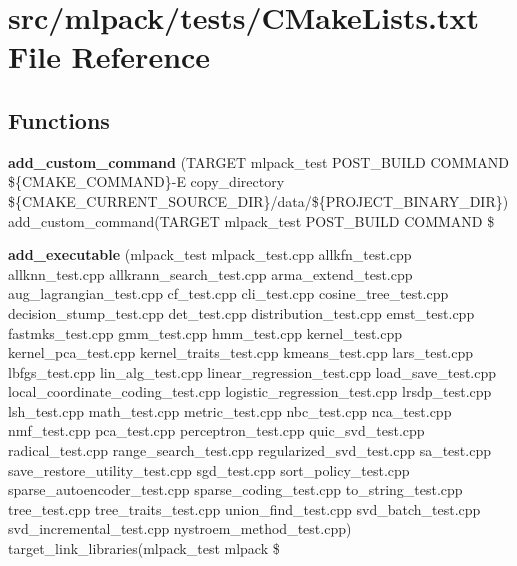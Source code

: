 \section{src/mlpack/tests/\-C\-Make\-Lists.txt File Reference}
\label{tests_2CMakeLists_8txt}
\subsection*{Functions}
\begin{DoxyCompactItemize}
\item 
{\bf add\-\_\-custom\-\_\-command} (T\-A\-R\-G\-E\-T mlpack\-\_\-test P\-O\-S\-T\-\_\-\-B\-U\-I\-L\-D C\-O\-M\-M\-A\-N\-D \$\{C\-M\-A\-K\-E\-\_\-\-C\-O\-M\-M\-A\-N\-D\}-\/E copy\-\_\-directory \$\{C\-M\-A\-K\-E\-\_\-\-C\-U\-R\-R\-E\-N\-T\-\_\-\-S\-O\-U\-R\-C\-E\-\_\-\-D\-I\-R\}/data/\$\{P\-R\-O\-J\-E\-C\-T\-\_\-\-B\-I\-N\-A\-R\-Y\-\_\-\-D\-I\-R\}) add\-\_\-custom\-\_\-command(T\-A\-R\-G\-E\-T mlpack\-\_\-test P\-O\-S\-T\-\_\-\-B\-U\-I\-L\-D C\-O\-M\-M\-A\-N\-D \$
\item 
{\bf add\-\_\-executable} (mlpack\-\_\-test mlpack\-\_\-test.\-cpp allkfn\-\_\-test.\-cpp allknn\-\_\-test.\-cpp allkrann\-\_\-search\-\_\-test.\-cpp arma\-\_\-extend\-\_\-test.\-cpp aug\-\_\-lagrangian\-\_\-test.\-cpp cf\-\_\-test.\-cpp cli\-\_\-test.\-cpp cosine\-\_\-tree\-\_\-test.\-cpp decision\-\_\-stump\-\_\-test.\-cpp det\-\_\-test.\-cpp distribution\-\_\-test.\-cpp emst\-\_\-test.\-cpp fastmks\-\_\-test.\-cpp gmm\-\_\-test.\-cpp hmm\-\_\-test.\-cpp kernel\-\_\-test.\-cpp kernel\-\_\-pca\-\_\-test.\-cpp kernel\-\_\-traits\-\_\-test.\-cpp kmeans\-\_\-test.\-cpp lars\-\_\-test.\-cpp lbfgs\-\_\-test.\-cpp lin\-\_\-alg\-\_\-test.\-cpp linear\-\_\-regression\-\_\-test.\-cpp load\-\_\-save\-\_\-test.\-cpp local\-\_\-coordinate\-\_\-coding\-\_\-test.\-cpp logistic\-\_\-regression\-\_\-test.\-cpp lrsdp\-\_\-test.\-cpp lsh\-\_\-test.\-cpp math\-\_\-test.\-cpp metric\-\_\-test.\-cpp nbc\-\_\-test.\-cpp nca\-\_\-test.\-cpp nmf\-\_\-test.\-cpp pca\-\_\-test.\-cpp perceptron\-\_\-test.\-cpp quic\-\_\-svd\-\_\-test.\-cpp radical\-\_\-test.\-cpp range\-\_\-search\-\_\-test.\-cpp regularized\-\_\-svd\-\_\-test.\-cpp sa\-\_\-test.\-cpp save\-\_\-restore\-\_\-utility\-\_\-test.\-cpp sgd\-\_\-test.\-cpp sort\-\_\-policy\-\_\-test.\-cpp sparse\-\_\-autoencoder\-\_\-test.\-cpp sparse\-\_\-coding\-\_\-test.\-cpp to\-\_\-string\-\_\-test.\-cpp tree\-\_\-test.\-cpp tree\-\_\-traits\-\_\-test.\-cpp union\-\_\-find\-\_\-test.\-cpp svd\-\_\-batch\-\_\-test.\-cpp svd\-\_\-incremental\-\_\-test.\-cpp nystroem\-\_\-method\-\_\-test.\-cpp) target\-\_\-link\-\_\-libraries(mlpack\-\_\-test mlpack \$
\end{DoxyCompactItemize}



